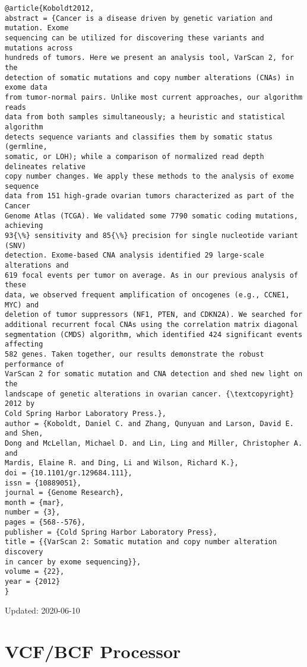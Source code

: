 \documentclass[]{article}
\begin{document}
\begin{verbatim}
@article{Koboldt2012,
abstract = {Cancer is a disease driven by genetic variation and mutation. Exome
sequencing can be utilized for discovering these variants and mutations across
hundreds of tumors. Here we present an analysis tool, VarScan 2, for the
detection of somatic mutations and copy number alterations (CNAs) in exome data
from tumor-normal pairs. Unlike most current approaches, our algorithm reads
data from both samples simultaneously; a heuristic and statistical algorithm
detects sequence variants and classifies them by somatic status (germline,
somatic, or LOH); while a comparison of normalized read depth delineates relative
copy number changes. We apply these methods to the analysis of exome sequence
data from 151 high-grade ovarian tumors characterized as part of the Cancer
Genome Atlas (TCGA). We validated some 7790 somatic coding mutations, achieving
93{\%} sensitivity and 85{\%} precision for single nucleotide variant (SNV)
detection. Exome-based CNA analysis identified 29 large-scale alterations and
619 focal events per tumor on average. As in our previous analysis of these
data, we observed frequent amplification of oncogenes (e.g., CCNE1, MYC) and
deletion of tumor suppressors (NF1, PTEN, and CDKN2A). We searched for
additional recurrent focal CNAs using the correlation matrix diagonal
segmentation (CMDS) algorithm, which identified 424 significant events affecting
582 genes. Taken together, our results demonstrate the robust performance of
VarScan 2 for somatic mutation and CNA detection and shed new light on the
landscape of genetic alterations in ovarian cancer. {\textcopyright} 2012 by
Cold Spring Harbor Laboratory Press.},
author = {Koboldt, Daniel C. and Zhang, Qunyuan and Larson, David E. and Shen,
Dong and McLellan, Michael D. and Lin, Ling and Miller, Christopher A. and
Mardis, Elaine R. and Ding, Li and Wilson, Richard K.},
doi = {10.1101/gr.129684.111},
issn = {10889051},
journal = {Genome Research},
month = {mar},
number = {3},
pages = {568--576},
publisher = {Cold Spring Harbor Laboratory Press},
title = {{VarScan 2: Somatic mutation and copy number alteration discovery
in cancer by exome sequencing}},
volume = {22},
year = {2012}
}
\end{verbatim}

Updated: 2020-06-10


\part{VCF/BCF Processor}
\end{document}
